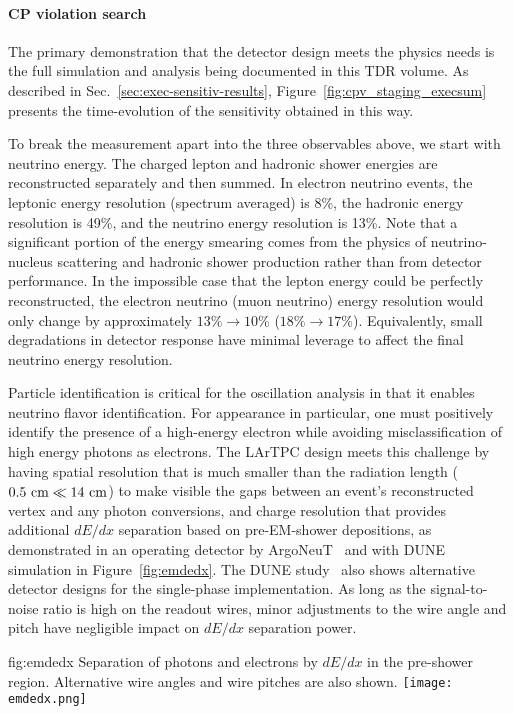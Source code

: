 \paragraph{\bf CP violation search}
The primary demonstration that the detector design meets
the physics needs is the full simulation and analysis
being documented in this TDR volume.  As described in 
Sec.~\ref{sec:exec-sensitiv-results}, 
Figure~\ref{fig:cpv_staging_execsum}
presents the time-evolution of the  sensitivity 
obtained in this way.


To break the measurement apart into the three
observables above, we start with neutrino energy.
The charged lepton and hadronic shower energies are
reconstructed separately and then summed.  In electron
neutrino events, the leptonic energy resolution
(spectrum averaged) is 8\%, the hadronic energy resolution
is 49\%, and the neutrino energy resolution is 13\%.
Note that a significant portion of the energy smearing
comes from the physics of neutrino-nucleus scattering
and hadronic shower production rather than from detector
performance.  In the impossible case that the lepton
energy could be perfectly reconstructed, the electron
neutrino (muon neutrino) energy resolution would only
change by approximately $13\%\rightarrow 10\%$ 
($18\%\rightarrow 17\%$).
Equivalently, small degradations in detector response
have minimal leverage to affect the final neutrino energy
resolution.

Particle identification is critical for the oscillation analysis 
in that it enables neutrino flavor identification.  
For \nue{} appearance in particular, one
must positively identify the presence of a high-energy
electron while avoiding misclassification of high energy
photons as electrons. The LArTPC design meets this challenge
by having spatial resolution that is much smaller than the
radiation length ($0.5~\rm{cm} \ll 14~\rm{cm}$) to make
visible the gaps between an event's reconstructed vertex
and any photon conversions, and charge resolution that
provides additional $dE/dx$ separation based on pre-EM-shower
depositions, as demonstrated in an operating detector by
ArgoNeuT~\cite{Acciarri:2016sli} and with DUNE simulation
in Figure~\ref{fig:emdedx}.  The DUNE study~\cite{bib:docdb3384}
also shows alternative detector designs for the 
single-phase \lartpc implementation.  As long as
the signal-to-noise ratio is high on the readout wires,
minor adjustments to the wire angle and pitch have negligible
impact on $dE/dx$ separation power.
%
\begin{dunefigure}
{fig:emdedx}
{Separation of photons and electrons by $dE/dx$
in the pre-shower region.  Alternative wire angles and wire
pitches are also shown.}
  \texttt{[image: emdedx.png]}
\end{dunefigure}

